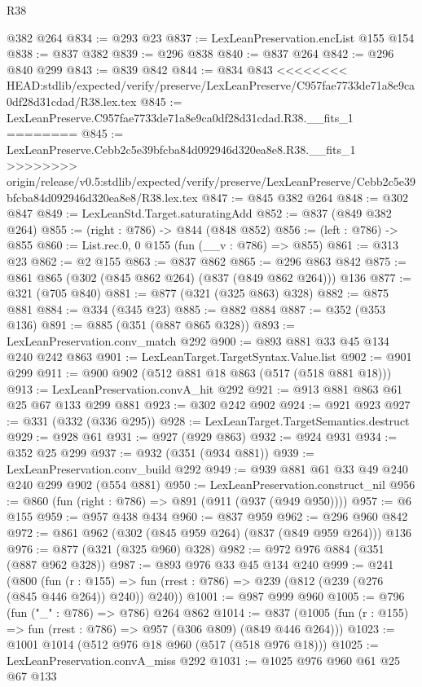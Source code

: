 \begin{lexlean}{R38}
\begin{coremodule}
{{{{{{{{{{{{    @382
    @264
@834 := @293 @23
@837 := LexLeanPreservation.encList @155 @154
@838 := @837 @382
@839 := @296 @838
@840 := @837 @264
@842 := @296 @840 @299
@843 := @839 @842
@844 := @834 @843
<<<<<<<< HEAD:stdlib/expected/verify/preserve/LexLeanPreserve/C957fae7733de71a8e9ca0df28d31cdad/R38.lex.tex
@845 := LexLeanPreserve.C957fae7733de71a8e9ca0df28d31cdad.R38.__fits_1
========
@845 := LexLeanPreserve.Cebb2c5e39bfcba84d092946d320ea8e8.R38.__fits_1
>>>>>>>> origin/release/v0.5:stdlib/expected/verify/preserve/LexLeanPreserve/Cebb2c5e39bfcba84d092946d320ea8e8/R38.lex.tex
@847 := @845 @382 @264
@848 := @302 @847
@849 := LexLeanStd.Target.saturatingAdd
@852 := @837 (@849 @382 @264)
@855 := (right : @786) -> @844 (@848 @852)
@856 := (left : @786) -> @855
@860 := List.rec.{0, 0} @155 (fun (__v : @786) => @855)
@861 := @313 @23
@862 := @2 @155
@863 := @837 @862
@865 := @296 @863 @842
@875 := @861 @865 (@302 (@845 @862 @264) (@837 (@849 @862 @264))) @136
@877 := @321 (@705 @840)
@881 := @877 (@321 (@325 @863) @328)
@882 := @875 @881
@884 := @334 (@345 @23)
@885 := @882 @884
@887 := @352 (@353 @136)
@891 := @885 (@351 (@887 @865 @328))
@893 := LexLeanPreservation.conv_match @292
@900 := @893 @881 @33 @45 @134 @240 @242 @863
@901 := LexLeanTarget.TargetSyntax.Value.list
@902 := @901 @299
@911 := @900 @902 (@512 @881 @18 @863 (@517 (@518 @881 @18)))
@913 := LexLeanPreservation.convA_hit @292
@921 := @913 @881 @863 @61 @25 @67 @133 @299 @881
@923 := @302 @242 @902
@924 := @921 @923
@927 := @331 (@332 (@336 @295))
@928 := LexLeanTarget.TargetSemantics.destruct
@929 := @928 @61
@931 := @927 (@929 @863)
@932 := @924 @931
@934 := @352 @25 @299
@937 := @932 (@351 (@934 @881))
@939 := LexLeanPreservation.conv_build @292
@949 := @939 @881 @61 @33 @49 @240 @240 @299 @902 (@554 @881)
@950 := LexLeanPreservation.construct_nil
@956 := @860 (fun (right : @786) => @891 (@911 (@937 (@949 @950))))
@957 := @6 @155
@959 := @957 @438 @434
@960 := @837 @959
@962 := @296 @960 @842
@972 := @861 @962 (@302 (@845 @959 @264) (@837 (@849 @959 @264))) @136
@976 := @877 (@321 (@325 @960) @328)
@982 := @972 @976 @884 (@351 (@887 @962 @328))
@987 := @893 @976 @33 @45 @134 @240
@999 := @241
    (@800
      (fun (r : @155) =>
      fun (rrest : @786) => @239 (@812 (@239 (@276 (@845 @446 @264)) @240)) @240))
@1001 := @987 @999 @960
@1005 := @796 (fun ("_" : @786) => @786) @264 @862
@1014 := @837 (@1005 (fun (r : @155) => fun (rrest : @786) => @957 (@306 @809) (@849 @446 @264)))
@1023 := @1001 @1014 (@512 @976 @18 @960 (@517 (@518 @976 @18)))
@1025 := LexLeanPreservation.convA_miss @292
@1031 := @1025 @976 @960 @61 @25 @67 @133
}}}}}}}}}}}}
\end{coremodule}
\end{lexlean}
